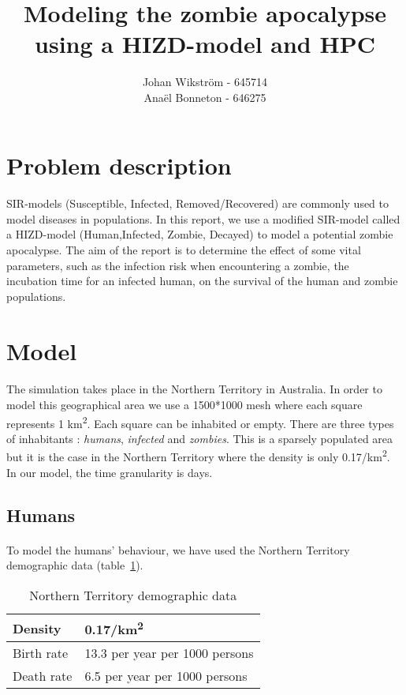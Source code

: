 \documentclass{report}
\begin{document}
\title{Modeling the zombie apocalypse using a HIZD-model and HPC}
\author{Johan Wikström - 645714 \\
        Anaël Bonneton - 646275}
\maketitle
\tableofcontents

\section{Problem description}	

\paragraph{}
SIR-models (Susceptible, Infected, Removed/Recovered) are commonly used to model diseases in populations. In this report, we use a modified SIR-model called a HIZD-model (Human,Infected, Zombie, Decayed) to model a potential zombie apocalypse. The aim of the report is to determine the effect of some vital parameters, such as the infection risk when encountering a zombie, the incubation time for an infected human, on the survival of the human and zombie populations.

\section{Model}

\paragraph{}
The simulation takes place in the Northern Territory in Australia. In order to model this geographical area we use a 1500*1000 mesh where each square represents 1 km\textsuperscript{2}. Each square can be inhabited or empty. There are three types of inhabitants : \emph{humans}, \emph{infected} and \emph{zombies}. This is a sparsely populated area but it is the case in the Northern Territory where the density is only 0.17/km\textsuperscript{2}. In our model, the time granularity is days. 

\subsection{Humans}
\paragraph{}
To model the humans' behaviour, we have used the Northern Territory demographic data (table~\ref{AustralianData}).
\begin{table}[!h]
    \begin{tabular}{|l|l|}
      \hline
        Density    & 0.17/km\textsuperscript{2} \\
      \hline
        Birth rate & 13.3 per year per 1000 persons \\
      \hline
        Death rate & 6.5 per year per 1000 persons \\
      \hline
\end{tabular}
\caption{Northern Territory demographic data}\label{AustralianData}
\end{table}
\end{document}
